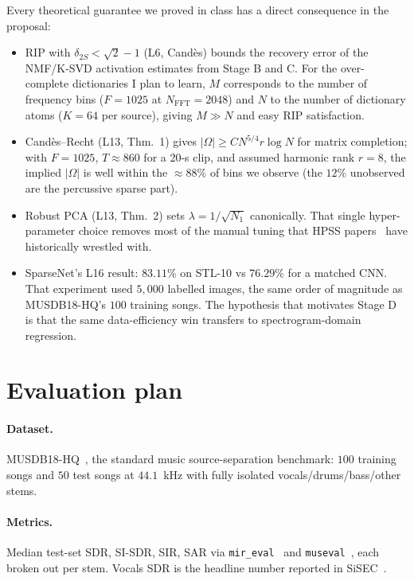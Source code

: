 \documentclass[11pt]{article}
\begin{document}
Every theoretical guarantee we proved in class has a direct consequence
in the proposal:
\begin{itemize}
\item RIP with $\delta_{2S}<\sqrt{2}-1$ (L6, Cand\`es) bounds the
recovery error of the NMF/K-SVD activation estimates from
Stage B and C.  For the over-complete dictionaries I plan to learn,
$M$ corresponds to the number of frequency bins ($F\!=\!1025$ at
$N_{\text{FFT}}{=}2048$) and $N$ to the number of dictionary atoms
($K\!=\!64$ per source), giving $M{\gg}N$ and easy RIP satisfaction.
\item Cand\`es--Recht (L13, Thm.~1) gives $|\Omega|\ge CN^{5/4} r\log N$
for matrix completion; with $F\!=\!1025$, $T\!\approx\!860$ for a 20-s clip,
and assumed harmonic rank $r\!=\!8$, the implied $|\Omega|$ is well within
the $\approx 88\%$ of bins we observe (the $12\%$ unobserved are the
percussive sparse part).
\item Robust PCA (L13, Thm.~2) sets $\lambda{=}1/\sqrt{N_1}$ canonically.
That single hyper-parameter choice removes most of the manual tuning that
HPSS papers~\cite{hpss} have historically wrestled with.
\item SparseNet's L16 result: $83.11\%$ on STL-10 vs $76.29\%$ for a
matched CNN.  That experiment used $5{,}000$ labelled images, the same
order of magnitude as MUSDB18-HQ's $100$ training songs.  The hypothesis
that motivates Stage D is that the same data-efficiency win transfers
to spectrogram-domain regression.
\end{itemize}

\section{Evaluation plan}
\paragraph{Dataset.} MUSDB18-HQ~\cite{musdb18hq}, the standard music
source-separation benchmark: $100$ training songs and $50$ test songs at
$44.1$~kHz with fully isolated vocals/drums/bass/other stems.

\paragraph{Metrics.} Median test-set SDR, SI-SDR, SIR, SAR via
\texttt{mir\_eval}~\cite{mireval} and \texttt{museval}~\cite{museval}, each
broken out per stem.  Vocals SDR is the headline number reported in
SiSEC~\cite{sisec18}.
\end{document}
